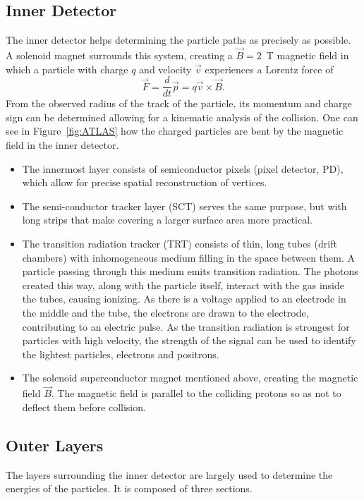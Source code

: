 \documentclass[twocolumn]{article}
\begin{document}
\subsection{Inner Detector}
The inner detector helps determining the particle paths as precisely as possible. A solenoid magnet surrounds this system, creating a $\vec{B} = 2$~T magnetic field in which a particle with charge $q$ and velocity $\vec{v}$ experiences a Lorentz force of 
\begin{equation}
\vec{F} = \frac{d}{dt} \vec{p} = q \vec{v} \times \vec{B}.\nonumber
\end{equation}
From the observed radius of the track of the particle, its momentum and charge sign can be determined allowing for a kinematic analysis of the collision. One can see in Figure~\ref{fig:ATLAS} how the charged particles are bent by the magnetic field in the inner detector.
\begin{itemize}
\item The innermost layer consists of semiconductor pixels (pixel detector, PD), which allow for precise spatial reconstruction of vertices.
\item The semi-conductor tracker layer (SCT) serves the same purpose, but with long strips that make covering a larger surface area more practical.
\item The transition radiation tracker (TRT) consists of thin, long tubes (drift chambers) with inhomogeneous medium filling in the space between them. A particle passing through this medium emits transition radiation. The photons created this way, along with the particle itself, interact with the gas inside the tubes, causing ionizing. As there is a voltage applied to an electrode in the middle and the tube, the electrons are drawn to the electrode, contributing to an electric pulse. As the transition radiation is strongest for particles with high velocity, the strength of the signal can be used to identify the lightest particles, electrons and positrons.
\item The solenoid superconductor magnet mentioned above, creating the magnetic field $\vec{B}$. The magnetic field is parallel to the colliding protons so as not to deflect them before collision.
\end{itemize}

\subsection{Outer Layers}
The layers surrounding the inner detector are largely used to determine the energies of the particles. It is composed of three sections.
\end{document}
